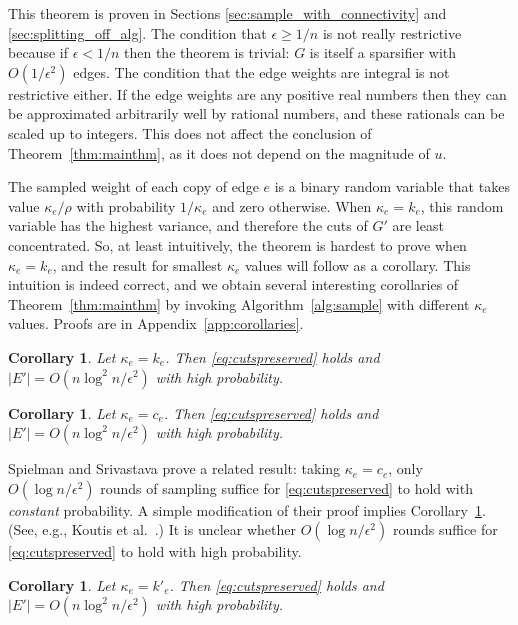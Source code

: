 \documentclass[11pt]{article}
\numberwithin{equation}{section}
\newtheorem{corollary}[theorem]{Corollary}
\newcommand{\eps}{\epsilon}
\newcommand{\Algorithm}[1]{Algorithm~\ref{alg:#1}}
\newcommand{\Appendix}[1]{Appendix~\ref{app:#1}}
\newcommand{\CorollaryName}[1]{\label{cor:#1}}
\newcommand{\Corollary}[1]{Corollary~\ref{cor:#1}}
\newcommand{\Theorem}[1]{Theorem~\ref{thm:#1}}
\begin{document}
This theorem is proven in Sections \ref{sec:sample_with_connectivity} and \ref{sec:splitting_off_alg}.
The condition that $\eps \geq 1/n$ is not really restrictive because
if $\eps < 1/n$ then the theorem is trivial: $G$ is itself a sparsifier with $O(1/\epsilon^2)$ edges.
The condition that the edge weights are integral is not restrictive either.
If the edge weights are any positive real numbers then they can be approximated
arbitrarily well by rational numbers, and these rationals can be scaled up to integers.
This does not affect the conclusion of \Theorem{mainthm}, as it
does not depend on the magnitude of $u$.

The sampled weight of each copy of edge $e$
is a binary random variable that takes value 
$\kappa_e/\rho$ with probability $1/\kappa_e$ and zero otherwise.
When $\kappa_e=k_e$, this random variable has the highest variance,
and therefore the cuts of $G'$ are least concentrated.
So, at least intuitively, the theorem is hardest to prove when $\kappa_e = k_e$,
and the result for smallest $\kappa_e$ values will follow as a corollary. 
This intuition is indeed correct, and we obtain several interesting corollaries of \Theorem{mainthm}
by invoking \Algorithm{sample} with different $\kappa_e$ values.
Proofs are in \Appendix{corollaries}.

\begin{corollary}
\CorollaryName{sample_with_connectivity}
Let $\kappa_e = k_e$. Then \eqref{eq:cutspreserved} holds
and $|E'| = O(n \log^2 n / \epsilon^2)$ with high probability.
\end{corollary}

\begin{corollary}
\CorollaryName{sample_with_conductance}
Let $\kappa_e = c_e$.
Then \eqref{eq:cutspreserved} holds
and $|E'| = O(n \log^2 n / \epsilon^2)$ with high probability.
\end{corollary}

Spielman and Srivastava \cite{SS} prove a related result:
taking $\kappa_e = c_e$, only $O(\log n/\epsilon^2)$ rounds of sampling suffice
for \eqref{eq:cutspreserved} to hold with \emph{constant} probability.
A simple modification of their proof implies \Corollary{sample_with_conductance}.
(See, e.g., Koutis et al.~\cite{KMP}.)
It is unclear whether $O(\log n/\epsilon^2)$ rounds suffice
for \eqref{eq:cutspreserved} to hold with high probability.

\begin{corollary}
\CorollaryName{sample_with_strength}
Let $\kappa_e = k'_e$.
Then \eqref{eq:cutspreserved} holds
and $|E'| = O(n \log^2 n / \epsilon^2)$ with high probability.
\end{corollary}
\end{document}
